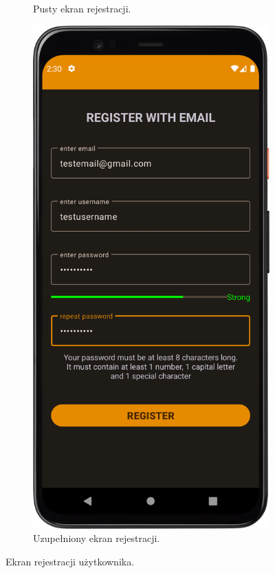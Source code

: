 \begin{figure}[!ht]
\begin{subfigure}[b]{0.38\textwidth}
                \caption{Pusty ekran rejestracji.\label{register1}}
            \end{subfigure}
            \hfill
            \begin{subfigure}[b]{0.38\textwidth}
                \centering
                \includegraphics[width=\textwidth]{src/app/register2.png}
                \caption{Uzupełniony ekran rejestracji.\label{register2}}
            \end{subfigure}
            \caption{Ekran rejestracji użytkownika.\label{register}}
            \qquad
        \end{figure} 

